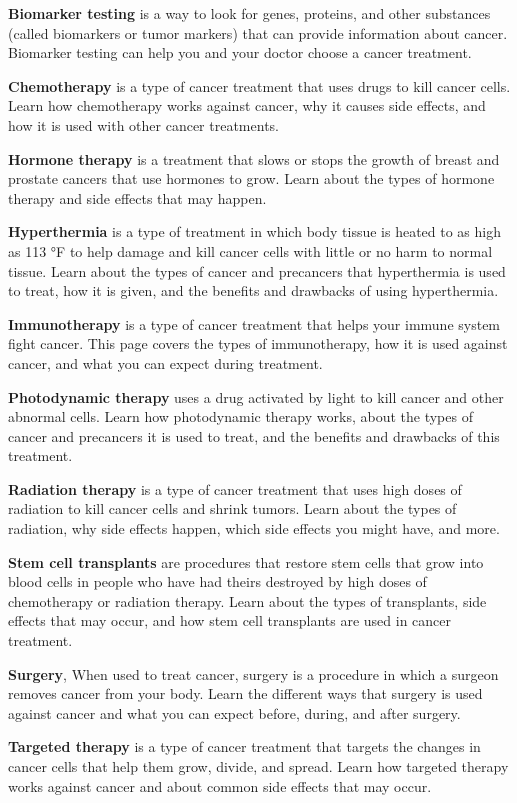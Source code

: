 \documentclass[
]{article}
\begin{document}
\textbf{Biomarker testing} is a way to look for genes, proteins, and
other substances (called biomarkers or tumor markers) that can provide
information about cancer. Biomarker testing can help you and your doctor
choose a cancer treatment.

\textbf{Chemotherapy} is a type of cancer treatment that uses drugs to
kill cancer cells. Learn how chemotherapy works against cancer, why it
causes side effects, and how it is used with other cancer treatments.

\textbf{Hormone therapy} is a treatment that slows or stops the growth
of breast and prostate cancers that use hormones to grow. Learn about
the types of hormone therapy and side effects that may happen.

\textbf{Hyperthermia} is a type of treatment in which body tissue is
heated to as high as 113 °F to help damage and kill cancer cells with
little or no harm to normal tissue. Learn about the types of cancer and
precancers that hyperthermia is used to treat, how it is given, and the
benefits and drawbacks of using hyperthermia.

\textbf{Immunotherapy} is a type of cancer treatment that helps your
immune system fight cancer. This page covers the types of immunotherapy,
how it is used against cancer, and what you can expect during treatment.

\textbf{Photodynamic therapy} uses a drug activated by light to kill
cancer and other abnormal cells. Learn how photodynamic therapy works,
about the types of cancer and precancers it is used to treat, and the
benefits and drawbacks of this treatment.

\textbf{Radiation therapy} is a type of cancer treatment that uses high
doses of radiation to kill cancer cells and shrink tumors. Learn about
the types of radiation, why side effects happen, which side effects you
might have, and more.

\textbf{Stem cell transplants} are procedures that restore stem cells
that grow into blood cells in people who have had theirs destroyed by
high doses of chemotherapy or radiation therapy. Learn about the types
of transplants, side effects that may occur, and how stem cell
transplants are used in cancer treatment.

\textbf{Surgery}, When used to treat cancer, surgery is a procedure in
which a surgeon removes cancer from your body. Learn the different ways
that surgery is used against cancer and what you can expect before,
during, and after surgery.

\textbf{Targeted therapy} is a type of cancer treatment that targets the
changes in cancer cells that help them grow, divide, and spread. Learn
how targeted therapy works against cancer and about common side effects
that may occur.
\end{document}
